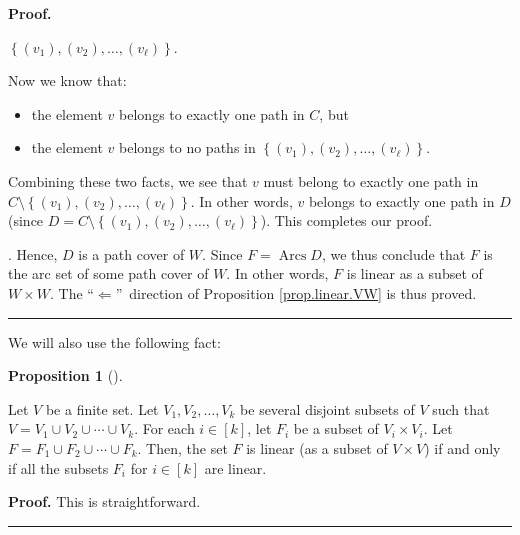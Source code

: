 \documentclass[numbers=enddot,12pt,final,onecolumn,notitlepage]{scrartcl}%
\numberwithin{exer}{section}
\theoremstyle{definition}
\newtheorem{prop}[theo]{Proposition}
\newenvironment{proposition}[1][]
{\begin{prop}[#1]\begin{leftbar}}
{\end{leftbar}\end{prop}}
\newenvironment{proof}[1][Proof]{\noindent\textbf{#1.} }{\ \rule{0.5em}{0.5em}}
\newenvironment{verlong}{}{}
\newenvironment{vershort}{}{}
\begin{document}
\begin{verlong}
\begin{proof}
{$\left\{  \left(  v_{1}\right)  ,\left(  v_{2}\right)  ,\ldots,\left(
v_{\ell}\right)  \right\}  $.
\par
Now we know that:
\par
\begin{itemize}
\item the element $v$ belongs to exactly one path in $C$, but
\par
\item the element $v$ belongs to no paths in $\left\{  \left(  v_{1}\right)
,\left(  v_{2}\right)  ,\ldots,\left(  v_{\ell}\right)  \right\}  $.
\end{itemize}
\par
Combining these two facts, we see that $v$ must belong to exactly one path in
$C\setminus\left\{  \left(  v_{1}\right)  ,\left(  v_{2}\right)
,\ldots,\left(  v_{\ell}\right)  \right\}  $. In other words, $v$ belongs to
exactly one path in $D$ (since $D=C\setminus\left\{  \left(  v_{1}\right)
,\left(  v_{2}\right)  ,\ldots,\left(  v_{\ell}\right)  \right\}  $). This
completes our proof.}. Hence, $D$ is a path cover of $W$. Since
$F=\operatorname*{Arcs}D$, we thus conclude that $F$ is the arc set of some
path cover of $W$. In other words, $F$ is linear as a subset of $W\times W$.
The \textquotedblleft$\Longleftarrow$\textquotedblright\ direction of
Proposition \ref{prop.linear.VW} is thus proved.
\end{proof}
\end{verlong}

We will also use the following fact:

\begin{proposition}
\label{prop.linear.Vi}Let $V$ be a finite set. Let $V_{1},V_{2},\ldots,V_{k}$
be several disjoint subsets of $V$ such that $V=V_{1}\cup V_{2}\cup\cdots\cup
V_{k}$. For each $i\in\left[  k\right]  $, let $F_{i}$ be a subset of
$V_{i}\times V_{i}$. Let $F=F_{1}\cup F_{2}\cup\cdots\cup F_{k}$. Then, the
set $F$ is linear (as a subset of $V\times V$) if and only if all the subsets
$F_{i}$ for $i\in\left[  k\right]  $ are linear.
\end{proposition}

\begin{vershort}
\begin{proof}
This is straightforward.
\end{proof}
\end{vershort}
\end{document}

